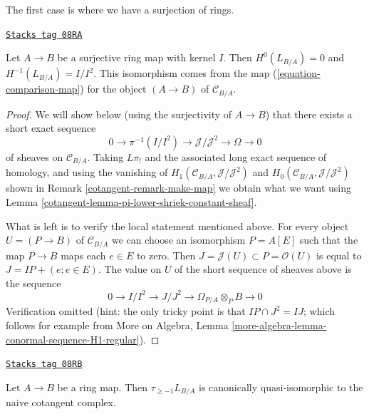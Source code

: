 The first case is where we have a surjection of rings.

\begin{lemma}
\label{cotangent-lemma-surjection}
\href{https://stacks.math.columbia.edu/tag/08RA}{\texttt{Stacks tag 08RA}}


Let $A \to B$ be a surjective ring map with kernel $I$.
Then $H^0(L_{B/A}) = 0$ and $H^{-1}(L_{B/A}) = I/I^2$.
This isomorphism comes from the map (\ref{equation-comparison-map})
for the object $(A \to B)$ of $\mathcal{C}_{B/A}$.
\end{lemma}

\begin{proof}

We will show below (using the surjectivity of $A \to B$)
that there exists a short exact sequence
$$
0 \to \pi^{-1}(I/I^2) \to \mathcal{J}/\mathcal{J}^2 \to \Omega \to 0
$$
of sheaves on $\mathcal{C}_{B/A}$. Taking $L\pi_!$ and
the associated long exact sequence of homology, and using the
vanishing of $H_1(\mathcal{C}_{B/A}, \mathcal{J}/\mathcal{J}^2)$ and
$H_0(\mathcal{C}_{B/A}, \mathcal{J}/\mathcal{J}^2)$
shown in Remark \ref{cotangent-remark-make-map} we obtain what we want using
Lemma \ref{cotangent-lemma-pi-lower-shriek-constant-sheaf}.

\medskip\noindent
What is left is to verify the local statement mentioned above.
For every object $U = (P \to B)$ of $\mathcal{C}_{B/A}$
we can choose an isomorphism $P = A[E]$ such that the map
$P \to B$ maps each $e \in E$ to zero. Then
$J = \mathcal{J}(U) \subset P = \mathcal{O}(U)$
is equal to $J = IP + (e; e \in E)$. The value on $U$ of the short sequence
of sheaves above is the sequence
$$
0 \to I/I^2 \to J/J^2 \to \Omega_{P/A} \otimes_P B \to 0
$$
Verification omitted (hint: the only tricky point is that
$IP \cap J^2 = IJ$; which follows for example from
More on Algebra, Lemma \ref{more-algebra-lemma-conormal-sequence-H1-regular}).
\end{proof}

\begin{lemma}
\label{cotangent-lemma-relation-with-naive-cotangent-complex}
\href{https://stacks.math.columbia.edu/tag/08RB}{\texttt{Stacks tag 08RB}}

Let $A \to B$ be a ring map. Then $\tau_{\geq -1}L_{B/A}$
is canonically quasi-isomorphic to the naive cotangent complex.
\end{lemma}


